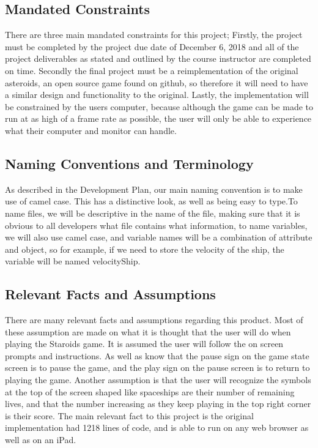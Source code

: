 \documentclass[12pt, titlepage]{article}
\begin{document}
\subsection{Mandated Constraints}
There are three main mandated constraints for this project; Firstly, the project must be completed by the project due date of December 6, 2018 and all of the project deliverables as stated and outlined by the course instructor are completed on time. Secondly the final project must be a reimplementation of the original  asteroids, an open source game found on github, so therefore it will need to have a similar design and functionality to the original. Lastly, the implementation will be constrained by the users computer, because although the game can be made to run at as high of a frame rate as possible, the user will only be able to experience what their computer and monitor can handle.\\

\subsection{Naming Conventions and Terminology}
As described in the Development Plan, our main naming convention is to make use of camel case. This has a distinctive look, as well as being easy to type.To name files, we will be descriptive in the name of the file, making sure that it is obvious to all developers what file contains what information, to name variables, we will also use camel case, and variable names will be a combination of attribute and object, so for example, if we need to store the velocity of the ship, the variable will be named velocityShip.\\

\subsection{Relevant Facts and Assumptions}
There are many relevant facts and assumptions regarding this product. Most of these assumption are made on what it is thought that the user will do when playing the Staroids game. It is assumed the user will follow the on screen prompts and instructions. As well as know that the pause sign on the game state screen is to pause the game, and the play sign on the pause screen is to return to playing the game. Another assumption is that the user will recognize the symbols at the top of the screen shaped like spaceships are their number of remaining lives, and that the number increasing as they keep playing in the top right corner is their score. The main relevant fact to this project is the original implementation had 1218 lines of code, and is able to run on any web browser as well as on an iPad.\\
\end{document}
